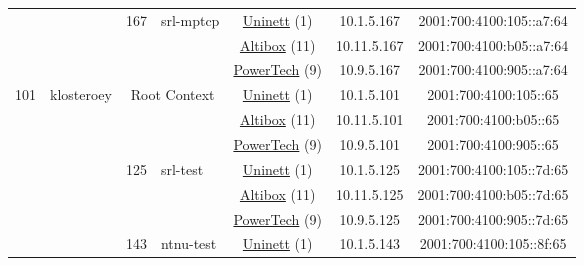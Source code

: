 \begin{small}
\begin{center}
\begin{longtable}{|c|c|c|c|c|c|c|c|}
  &  & \multirow{3}{*}{\tiny{167}} & \multicolumn{1}{|l|}{\multirow{3}{*}{\tiny{srl-mptcp}}} & \multicolumn{2}{|c|}{\tiny{\href{https://www.uninett.no}{Uninett} (1)}} & \tiny{10.1.5.167} & \tiny{2001:700:4100:105::a7:64} \\* \cline{5-5}\cline{6-6}\cline{7-7}\cline{8-8}
  &  &  &  & \multicolumn{2}{|c|}{\tiny{\href{https://www.altibox.no}{Altibox} (11)}} & \tiny{10.11.5.167} & \tiny{2001:700:4100:b05::a7:64} \\* \cline{5-5}\cline{6-6}\cline{7-7}\cline{8-8}
  &  &  &  & \multicolumn{2}{|c|}{\tiny{\href{http://www.powertech.no}{PowerTech} (9)}} & \tiny{10.9.5.167} & \tiny{2001:700:4100:905::a7:64} \\ \hline
 \multirow{18}{*}{\tiny{101}} & \multicolumn{1}{|l|}{\multirow{18}{*}{\tiny{klosteroey}}} & \multicolumn{2}{|c|}{\multirow{3}{*}{\tiny{Root Context}}} & \multicolumn{2}{|c|}{\tiny{\href{https://www.uninett.no}{Uninett} (1)}} & \tiny{10.1.5.101} & \tiny{2001:700:4100:105::65} \\* \cline{5-5}\cline{6-6}\cline{7-7}\cline{8-8}
  &  & \multicolumn{2}{|c|}{} & \multicolumn{2}{|c|}{\tiny{\href{https://www.altibox.no}{Altibox} (11)}} & \tiny{10.11.5.101} & \tiny{2001:700:4100:b05::65} \\* \cline{5-5}\cline{6-6}\cline{7-7}\cline{8-8}
  &  & \multicolumn{2}{|c|}{} & \multicolumn{2}{|c|}{\tiny{\href{http://www.powertech.no}{PowerTech} (9)}} & \tiny{10.9.5.101} & \tiny{2001:700:4100:905::65} \\* \cline{3-3}\cline{4-4}\cline{5-5}\cline{6-6}\cline{7-7}\cline{8-8}
  &  & \multirow{3}{*}{\tiny{125}} & \multicolumn{1}{|l|}{\multirow{3}{*}{\tiny{srl-test}}} & \multicolumn{2}{|c|}{\tiny{\href{https://www.uninett.no}{Uninett} (1)}} & \tiny{10.1.5.125} & \tiny{2001:700:4100:105::7d:65} \\* \cline{5-5}\cline{6-6}\cline{7-7}\cline{8-8}
  &  &  &  & \multicolumn{2}{|c|}{\tiny{\href{https://www.altibox.no}{Altibox} (11)}} & \tiny{10.11.5.125} & \tiny{2001:700:4100:b05::7d:65} \\* \cline{5-5}\cline{6-6}\cline{7-7}\cline{8-8}
  &  &  &  & \multicolumn{2}{|c|}{\tiny{\href{http://www.powertech.no}{PowerTech} (9)}} & \tiny{10.9.5.125} & \tiny{2001:700:4100:905::7d:65} \\* \cline{3-3}\cline{4-4}\cline{5-5}\cline{6-6}\cline{7-7}\cline{8-8}
  &  & \multirow{3}{*}{\tiny{143}} & \multicolumn{1}{|l|}{\multirow{3}{*}{\tiny{ntnu-test}}} & \multicolumn{2}{|c|}{\tiny{\href{https://www.uninett.no}{Uninett} (1)}} & \tiny{10.1.5.143} & \tiny{2001:700:4100:105::8f:65} \\* \cline{5-5}\cline{6-6}\cline{7-7}\cline{8-8}

\end{longtable}
\end{center}
\end{small}
